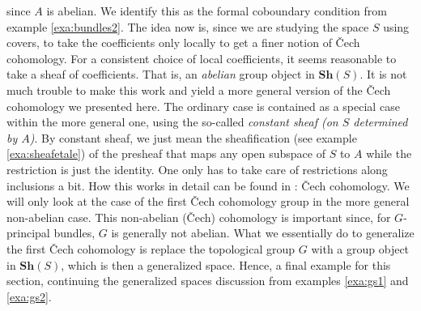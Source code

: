 since $A$ is abelian.
We identify this as the formal coboundary condition from example \ref{exa:bundles2}.
The idea now is, since we are studying the space $S$ using covers, to take the coefficients only locally to get a finer notion of \v{C}ech cohomology.
For a consistent choice of local coefficients, it seems reasonable to take a sheaf of coefficients.
That is, an \textit{abelian} group object in $\mathbf{Sh}(S)$.
It is not much trouble to make this work and yield a more general version of the \v{C}ech cohomology we presented here.
The ordinary case is contained as a special case within the more general one, using the so-called \textit{constant sheaf (on $S$ determined by $A$)}.
By constant sheaf, we just mean the sheafification (see example \ref{exa:sheafetale}) of the presheaf that maps any open subspace of $S$ to $A$ while the restriction is just the identity.
One only has to take care of restrictions along inclusions a bit.
How this works in detail can be found in \cite{wiki-pedia0en}: \v{C}ech cohomology.
We will only look at the case of the first \v{C}ech cohomology group in the more general non-abelian case.
This non-abelian (\v{C}ech) cohomology is important since, for $G$-principal bundles, $G$ is generally not abelian.
What we essentially do to generalize the first \v{C}ech cohomology is replace the topological group $G$ with a group object in $\mathbf{Sh}(S)$, which is then a generalized space.
Hence, a final example for this section, continuing the generalized spaces discussion from examples \ref{exa:gs1} and \ref{exa:gs2}.
\\
